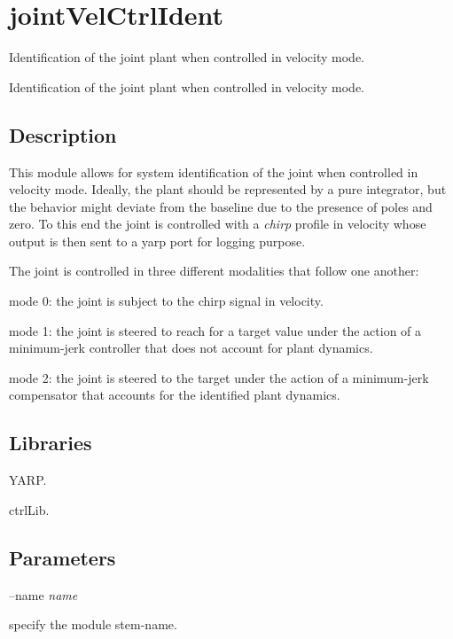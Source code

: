 \section{joint\+Vel\+Ctrl\+Ident}
\label{group__icub__jointVelCtrlIdent}


Identification of the joint plant when controlled in velocity mode.  


Identification of the joint plant when controlled in velocity mode. 

\hypertarget{group__icub__signalScope_intro_sec}{}\subsection{Description}\label{group__icub__signalScope_intro_sec}
This module allows for system identification of the joint when controlled in velocity mode. Ideally, the plant should be represented by a pure integrator, but the behavior might deviate from the baseline due to the presence of poles and zero. To this end the joint is controlled with a {\itshape chirp} profile in velocity whose output is then sent to a yarp port for logging purpose.

The joint is controlled in three different modalities that follow one another\+:
\begin{DoxyItemize}
\item mode 0\+: the joint is subject to the chirp signal in velocity.
\item mode 1\+: the joint is steered to reach for a target value under the action of a minimum-\/jerk controller that does not account for plant dynamics.
\item mode 2\+: the joint is steered to the target under the action of a minimum-\/jerk compensator that accounts for the identified plant dynamics.
\end{DoxyItemize}\hypertarget{group__icub__signalScope_lib_sec}{}\subsection{Libraries}\label{group__icub__signalScope_lib_sec}

\begin{DoxyItemize}
\item Y\+A\+RP.
\item ctrl\+Lib.
\end{DoxyItemize}\hypertarget{group__icub__signalScope_parameters_sec}{}\subsection{Parameters}\label{group__icub__signalScope_parameters_sec}
--name {\itshape name} 
\begin{DoxyItemize}
\item specify the module stem-\/name.
\end{DoxyItemize}

